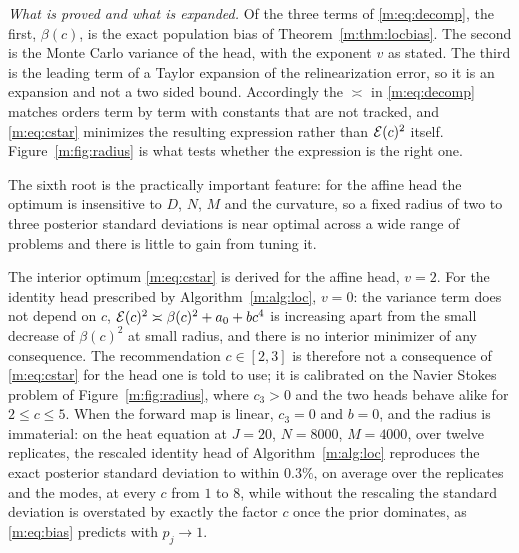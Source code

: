 \noindent\emph{What is proved and what is expanded.} Of the three terms of \eqref{m:eq:decomp}, the first, $\beta(c)$, is the exact population bias of Theorem~\ref{m:thm:locbias}. The second is the Monte Carlo variance of the head, with the exponent $v$ as stated. The third is the leading term of a Taylor expansion of the relinearization error, so it is an expansion and not a two sided bound. Accordingly the $\asymp$ in \eqref{m:eq:decomp} matches orders term by term with constants that are not tracked, and \eqref{m:eq:cstar} minimizes the resulting expression rather than $\mathcal{E}(c)^2$ itself. Figure~\ref{m:fig:radius} is what tests whether the expression is the right one.

The sixth root is the practically important feature: for the affine head the optimum is insensitive to $D$, $N$, $M$ and the curvature, so a fixed radius of two to three posterior standard deviations is near optimal across a wide range of problems and there is little to gain from tuning it.

\begin{remark}\label{m:rem:radiushead}
The interior optimum \eqref{m:eq:cstar} is derived for the affine head, $v=2$. For the identity head prescribed by Algorithm~\ref{m:alg:loc}, $v=0$: the variance term does not depend on $c$, $\mathcal{E}(c)^2\asymp\beta(c)^2+a_0+bc^4$ is increasing apart from the small decrease of $\beta(c)^2$ at small radius, and there is no interior minimizer of any consequence. The recommendation $c\in[2,3]$ is therefore not a consequence of \eqref{m:eq:cstar} for the head one is told to use; it is calibrated on the Navier Stokes problem of Figure~\ref{m:fig:radius}, where $c_3>0$ and the two heads behave alike for $2\le c\le5$. When the forward map is linear, $c_3=0$ and $b=0$, and the radius is immaterial: on the heat equation at $J=20$, $N=8000$, $M=4000$, over twelve replicates, the rescaled identity head of Algorithm~\ref{m:alg:loc} reproduces the exact posterior standard deviation to within $0.3\%$, on average over the replicates and the modes, at every $c$ from $1$ to $8$, while without the rescaling the standard deviation is overstated by exactly the factor $c$ once the prior dominates, as \eqref{m:eq:bias} predicts with $p_j\to1$.
\end{remark}

